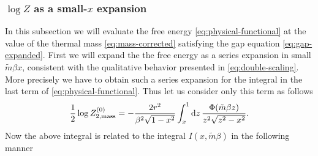 \documentclass[a4paper,11pt]{article}
\newcommand{\dd}{\mathrm d}
\begin{document}
\subsubsection{$\log Z$ as a small-$x$ expansion}
\label{sec:logZ}
In this subsection we will evaluate the free energy \eqref{eq:physical-functional} at the value of the thermal mass \eqref{eq:mass-corrected} satisfying the gap equation \eqref{eq:gap-expanded}. First we will expand the the free energy as a  series expansion  in small $\tilde m \beta x$,  consistent with the qualitative behavior presented in \eqref{eq:double-scaling}. More precisely we have to obtain such a series expansion for the integral in the last term of \eqref{eq:physical-functional}. Thus let us consider only this term as follows
%
\begin{equation}
 \frac12\log Z_{2,{\rm mass}}^{(0)}
 =-\frac{2r^2}{\beta^2\sqrt{1-x^2}}
 \int_x^1\dd z\,
 \frac{\Phi(\tilde m\beta z)}{z^2\sqrt{z^2-x^2}}.
 \label{eq:Zth-z}
\end{equation}
Now the above integral is related to the integral $I(x,\tilde m\beta)$  in the following manner
\end{document}
